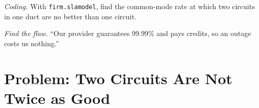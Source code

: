 \begin{exercise}[$\star\star\star$]\label{exo:nw:buying-connectivity:7}
\emph{Coding.} With \texttt{firm.slamodel}, find the common-mode rate at which two circuits in one duct are no better than one circuit.
\end{exercise}

\begin{exercise}[$\star\star\star$]\label{exo:nw:buying-connectivity:8}
\emph{Find the flaw.} ``Our provider guarantees 99.99\% and pays credits, so an outage costs us nothing.''
\end{exercise}

\section{Problem: Two Circuits Are Not Twice as Good}

